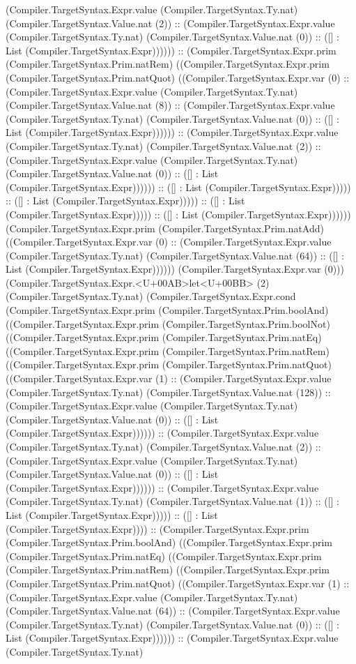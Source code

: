 \documentclass[11pt]{article}
\begin{document}
(Compiler.TargetSyntax.Expr.value (Compiler.TargetSyntax.Ty.nat) (Compiler.TargetSyntax.Value.nat (2)) :: (Compiler.TargetSyntax.Expr.value (Compiler.TargetSyntax.Ty.nat) (Compiler.TargetSyntax.Value.nat (0)) :: ([] : List (Compiler.TargetSyntax.Expr)))))) :: (Compiler.TargetSyntax.Expr.prim (Compiler.TargetSyntax.Prim.natRem) ((Compiler.TargetSyntax.Expr.prim (Compiler.TargetSyntax.Prim.natQuot) ((Compiler.TargetSyntax.Expr.var (0) :: (Compiler.TargetSyntax.Expr.value (Compiler.TargetSyntax.Ty.nat) (Compiler.TargetSyntax.Value.nat (8)) :: (Compiler.TargetSyntax.Expr.value (Compiler.TargetSyntax.Ty.nat) (Compiler.TargetSyntax.Value.nat (0)) :: ([] : List (Compiler.TargetSyntax.Expr)))))) :: (Compiler.TargetSyntax.Expr.value (Compiler.TargetSyntax.Ty.nat) (Compiler.TargetSyntax.Value.nat (2)) :: (Compiler.TargetSyntax.Expr.value (Compiler.TargetSyntax.Ty.nat) (Compiler.TargetSyntax.Value.nat (0)) :: ([] : List (Compiler.TargetSyntax.Expr)))))) :: ([] : List (Compiler.TargetSyntax.Expr))))) :: ([] : List (Compiler.TargetSyntax.Expr))))) :: ([] : List (Compiler.TargetSyntax.Expr))))) :: ([] : List (Compiler.TargetSyntax.Expr)))))) (Compiler.TargetSyntax.Expr.prim (Compiler.TargetSyntax.Prim.natAdd) ((Compiler.TargetSyntax.Expr.var (0) :: (Compiler.TargetSyntax.Expr.value (Compiler.TargetSyntax.Ty.nat) (Compiler.TargetSyntax.Value.nat (64)) :: ([] : List (Compiler.TargetSyntax.Expr)))))) (Compiler.TargetSyntax.Expr.var (0))) (Compiler.TargetSyntax.Expr.<U+00AB>let<U+00BB> (2) (Compiler.TargetSyntax.Ty.nat) (Compiler.TargetSyntax.Expr.cond (Compiler.TargetSyntax.Expr.prim (Compiler.TargetSyntax.Prim.boolAnd) ((Compiler.TargetSyntax.Expr.prim (Compiler.TargetSyntax.Prim.boolNot) ((Compiler.TargetSyntax.Expr.prim (Compiler.TargetSyntax.Prim.natEq) ((Compiler.TargetSyntax.Expr.prim (Compiler.TargetSyntax.Prim.natRem) ((Compiler.TargetSyntax.Expr.prim (Compiler.TargetSyntax.Prim.natQuot) ((Compiler.TargetSyntax.Expr.var (1) :: (Compiler.TargetSyntax.Expr.value (Compiler.TargetSyntax.Ty.nat) (Compiler.TargetSyntax.Value.nat (128)) :: (Compiler.TargetSyntax.Expr.value (Compiler.TargetSyntax.Ty.nat) (Compiler.TargetSyntax.Value.nat (0)) :: ([] : List (Compiler.TargetSyntax.Expr)))))) :: (Compiler.TargetSyntax.Expr.value (Compiler.TargetSyntax.Ty.nat) (Compiler.TargetSyntax.Value.nat (2)) :: (Compiler.TargetSyntax.Expr.value (Compiler.TargetSyntax.Ty.nat) (Compiler.TargetSyntax.Value.nat (0)) :: ([] : List (Compiler.TargetSyntax.Expr)))))) :: (Compiler.TargetSyntax.Expr.value (Compiler.TargetSyntax.Ty.nat) (Compiler.TargetSyntax.Value.nat (1)) :: ([] : List (Compiler.TargetSyntax.Expr))))) :: ([] : List (Compiler.TargetSyntax.Expr)))) :: (Compiler.TargetSyntax.Expr.prim (Compiler.TargetSyntax.Prim.boolAnd) ((Compiler.TargetSyntax.Expr.prim (Compiler.TargetSyntax.Prim.natEq) ((Compiler.TargetSyntax.Expr.prim (Compiler.TargetSyntax.Prim.natRem) ((Compiler.TargetSyntax.Expr.prim (Compiler.TargetSyntax.Prim.natQuot) ((Compiler.TargetSyntax.Expr.var (1) :: (Compiler.TargetSyntax.Expr.value (Compiler.TargetSyntax.Ty.nat) (Compiler.TargetSyntax.Value.nat (64)) :: (Compiler.TargetSyntax.Expr.value (Compiler.TargetSyntax.Ty.nat) (Compiler.TargetSyntax.Value.nat (0)) :: ([] : List (Compiler.TargetSyntax.Expr)))))) :: (Compiler.TargetSyntax.Expr.value (Compiler.TargetSyntax.Ty.nat) 
\end{document}
